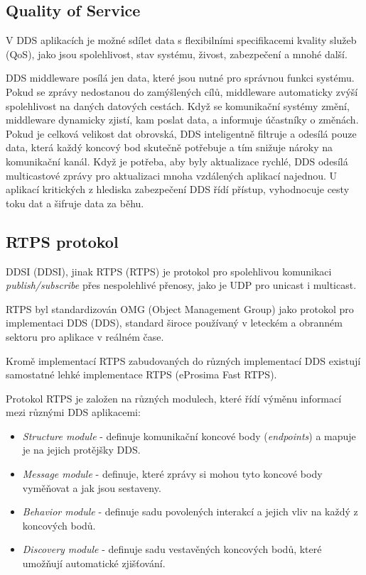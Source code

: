 \subsection{Quality of Service}

V \acs{DDS} aplikacích je možné sdílet data s flexibilními specifikacemi kvality služeb (\acs{QoS}), jako jsou spolehlivost, stav systému, živost, zabezpečení a mnohé další. 

\acs{DDS} middleware posílá jen data, které jsou nutné pro správnou funkci systému. Pokud se zprávy nedostanou do zamýšlených cílů, middleware automaticky zvýší spolehlivost na daných datových cestách. Když se komunikační systémy změní, middleware dynamicky zjistí, kam poslat data, a informuje účastníky o změnách. Pokud je celková velikost dat obrovská, \acs{DDS} inteligentně filtruje a odesílá pouze data, která každý koncový bod skutečně potřebuje a tím snižuje nároky na komunikační kanál. Když je potřeba, aby byly aktualizace rychlé, \acs{DDS} odesílá multicastové zprávy pro aktualizaci mnoha vzdálených aplikací najednou. U aplikací kritických z hlediska zabezpečení \acs{DDS} řídí přístup, vyhodnocuje cesty toku dat a šifruje data za běhu. \cite{DDS_Main}

\subsection{\acs{RTPS} protokol}

\acs{DDSI} (\acl{DDSI}), jinak \acs{RTPS} (\acl{RTPS}) je protokol pro spolehlivou komunikaci \textit{publish/subscribe} přes nespolehlivé přenosy, jako je UDP pro unicast i multicast. \cite{DDS_Standard}

\acs{RTPS} byl standardizován OMG (Object Management Group) jako protokol pro implementaci \acl{DDS} (\acs{DDS}), standard široce používaný v leteckém a obranném sektoru pro aplikace v reálném čase.

Kromě implementací \acs{RTPS} zabudovaných do různých implementací \acs{DDS} existují samostatné lehké implementace \acs{RTPS} (eProsima Fast \acs{RTPS}).

Protokol RTPS je založen na různých modulech, které řídí výměnu informací mezi různými \acs{DDS} aplikacemi: \cite{Eprosima}

\begin{itemize}
    \item \textit{Structure module} - definuje komunikační koncové body (\textit{endpoints}) a mapuje je na jejich protějšky \acs{DDS}.
    \item \textit{Message module} - definuje, které zprávy si mohou tyto koncové body vyměňovat a jak jsou sestaveny.
    \item \textit{Behavior module} - definuje sadu povolených interakcí a jejich vliv na každý z koncových bodů.
    \item \textit{Discovery module} - definuje sadu vestavěných koncových bodů, které umožňují automatické zjišťování.
\end{itemize}

